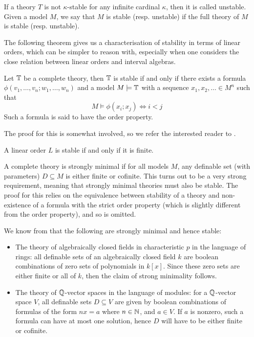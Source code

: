 If a theory $T$ is not $\kappa$-stable for any infinite cardinal $\kappa$, then it is called
unstable. Given a model $M$, we say that $M$ is stable (resp. unstable) if the full theory of $M$
is stable (resp. unstable).

The following theorem gives us a characterisation of stability in terms of linear orders, which can
be simpler to reason with, especially when one considers the close relation between linear orders
and interval algebras.

\begin{thm}\label{thm:stable_order_property}
  Let $\mathbb{T}$ be a complete theory, then $\mathbb{T}$ is stable if and only
  if there exists a formula $\phi(v_1,\dots,v_n;w_1,\dots,w_n)$ and a model $M \models \mathbb{T}$ with
  a sequence $x_1,x_2,\dots \in M^n$ such that
  \begin{equation*}
    M \models \phi(x_i;x_j) \iff i < j
  \end{equation*}
  Such a formula is said to have the order property.
\end{thm}

The proof for this is somewhat involved, so we refer the interested reader to \cite{marker02}.

\begin{cor}
  A linear order $L$ is stable if and only if it is finite.
\end{cor}

\begin{exmp}
  A complete theory is strongly minimal if for all models $M$, any definable set (with parameters)
  $D \subseteq M$ is either finite or cofinite. This turns out to be a very strong requirement,
  meaning that strongly minimal theories must also be stable. The proof for this relies on the
  equivalence between stability of a theory and non-existence of a formula with the strict order
  property (which is slightly different from the order property), and so is omitted.

  We know from \cite{marker02} that the following are strongly minimal and hence stable:
  \begin{itemize}
    \item The theory of algebraically closed fields in characteristic $p$ in the language of rings:
      all definable sets of an algebraically closed field $k$ are boolean combinations of zero sets
      of polynomials in $k[x]$. Since these zero sets are either finite or all of $k$, then the
      claim of strong minimality follows.
    \item The theory of $\mathbb{Q}$-vector spaces in the language of modules: for a $\mathbb{Q}$-vector space $V$,
      all definable sets $D \subseteq V$ are given by boolean combinations of formulas of the form
      $nx = a$ where $n \in \mathbb{N}$, and $a \in V$. If $a$ is nonzero, such a formula can have at most
      one solution, hence $D$ will have to be either finite or cofinite.
  \end{itemize}
\end{exmp}

